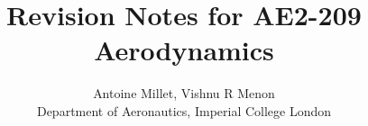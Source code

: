 \documentclass{summary_notes}
\begin{document}
\title{\textbf{Revision Notes for AE2-209 Aerodynamics}}
\author{Antoine Millet, Vishnu R Menon\\ 
\small{Department of Aeronautics, Imperial College London}}

\maketitle
\tableofcontents

\newpage
\end{document}
